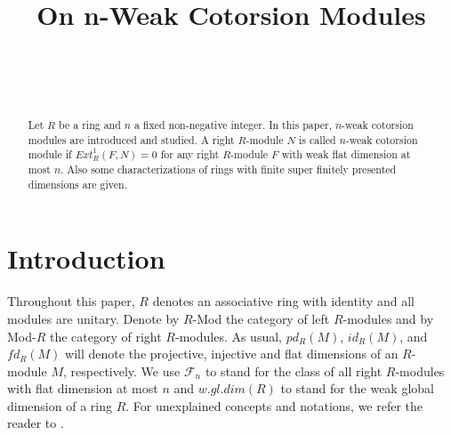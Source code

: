 ﻿\documentclass[
11pt,%
tightenlines,%
twoside,%
onecolumn,%
nofloats,%
nobibnotes,%
nofootinbib,%
superscriptaddress,%
noshowpacs,%
centertags]%
{revtex4}
\begin{document}

\title{On \lowercase{N}-Weak Cotorsion Modules}

\author{~}
 

\author{~}
 





\begin{abstract}
Let $R$ be a ring and $n$ a fixed non-negative integer. In this
paper, $n$-weak  cotorsion modules are introduced and studied. A
right $R$-module $N$ is called $n$-weak cotorsion module if
$Ext^1_R(F,N) = 0$ for any right $R$-module $F$ with weak flat
dimension at most $n$. Also some characterizations of rings with
finite super finitely presented dimensions are given.
\end{abstract}
 

\maketitle



\section{Introduction}

 Throughout this paper, $R$ denotes an associative ring with identity
  and all modules are unitary. Denote by $R$-Mod the category of left $R$-modules
   and by Mod-$R$ the category of right $R$-modules. As usual, $pd_R(M)$, $id_R(M)$,
   and $fd_R(M)$ will denote the projective, injective and flat dimensions of an $R$-module $M$, respectively.
    We use $\mathcal{F}_n$ to stand for the class of all right $R$-modules with flat dimension at
     most $n$ and $w. gl.dim(R)$ to stand for the weak global dimension of a ring $R$.
     For unexplained concepts and notations, we refer the reader to \cite{And, Eno, Rot, Xu}.
\end{document}
